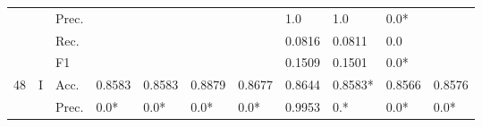 \begin{tabular}{cclllllllll}
                                                                                                               &                                   & Prec.                                                &                         &                         &                              &                         & 1.0                                                                          & 1.0                                                                         & 0.0*                                      &                                           \\
                                                                                                               &                                   & Rec.                                                 &                         &                         &                              &                         & 0.0816                                                                       & 0.0811                                                                      & 0.0                                       &                                           \\
                                                                                                               &                                   & F1                                                   &                         &                         &                              &                         & 0.1509                                                                       & 0.1501                                                                      & 0.0*                                      &                                           \\ 
    \midrule
    \multirow{12}{*}{48}                                                                                       & \multirow{4}{*}{I}                & Acc.                                                 & 0.8583                  & 0.8583                  & 0.8879                       & 0.8677                  & 0.8644                                                                       & 0.8583*                                                                     & 0.8566                                    & 0.8576                                    \\
                                                                                                               &                                   & Prec.                                                & 0.0*                    & 0.0*                    & 0.0*                         & 0.0*                    & 0.9953                                                                       & 0.*                                                                         & 0.0*                                      & 0.0*                                      \\

\end{tabular}
